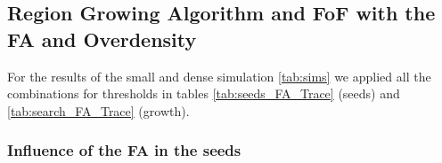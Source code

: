 \documentclass[12pt]{article}
\begin{document}
\subsection{Region Growing Algorithm and FoF with the FA and Overdensity}

\begin{par}
For the results of the small and dense simulation \ref{tab:sims} we applied all the combinations for thresholds in tables \ref{tab:seeds_FA_Trace} (seeds)  and \ref{tab:search_FA_Trace} (growth). 
\end{par}

\subsubsection{Influence of the FA in the seeds}
\end{document}
